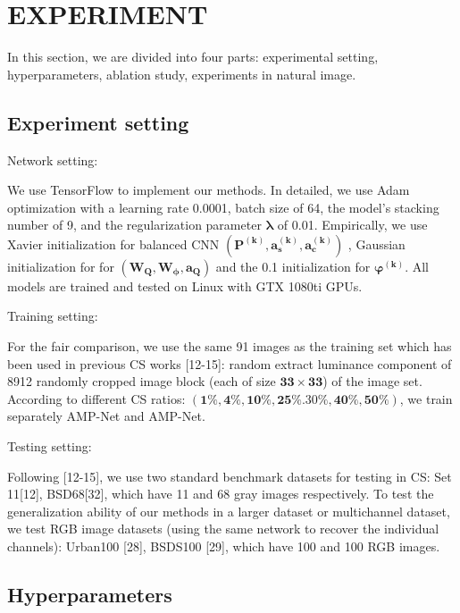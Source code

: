 \documentclass[conference]{IEEEtran}
\begin{document}
\section{ EXPERIMENT}
In this section, we are divided into four parts: experimental setting, hyperparameters, ablation study, experiments in natural image.
\subsection{ Experiment setting}
\begin{bfseries} 
Network setting:
\end{bfseries}
 We use TensorFlow to implement our methods. In detailed, we use Adam optimization with a learning rate 0.0001, batch size of 64, the model's stacking number of 9, and the regularization parameter $\bm{\lambda}$ of 0.01. Empirically, we use Xavier initialization for balanced CNN $\bm{(P^{(k)},a_s^{(k)}, a_c^{(k)})}$ , Gaussian initialization for for $\bm{(W_Q,W_\phi, a_Q)}$  and the 0.1 initialization for $\bm{\varphi^{(k)}}$. All models are trained and tested on Linux with GTX 1080ti GPUs.
 
\begin{bfseries} 
Training setting:
\end{bfseries} 
 For the fair comparison, we use the same 91 images as the training set which has been used in previous CS works [12-15]:  random extract luminance component of 8912 randomly cropped image block (each of size $\bm{33\times33}$) of the image set. According to different CS ratios: $\bm{(1\%,4\%,10\% ,25\%.30\%,40\%,50\%)}$, we train separately AMP-Net and AMP-Net.

\begin{bfseries} 
Testing setting:
\end{bfseries} 
Following [12-15], we use two standard benchmark datasets for testing in CS: Set 11[12], BSD68[32], which have 11 and 68 gray images respectively. To test the generalization ability of our methods in a larger dataset or multichannel dataset, we test RGB image datasets (using the same network to recover the individual channels): Urban100 [28], BSDS100 [29], which have 100 and 100 RGB images.

\subsection{Hyperparameters}
\end{document}
